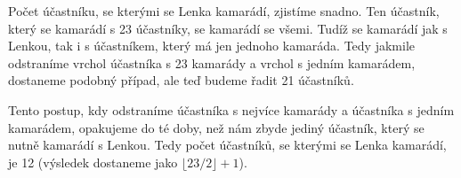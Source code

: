 \documentclass{fkssolpub}
\author{Ondřej Sedláček}
\begin{document}
Počet účastníku, se kterými se Lenka kamarádí, zjistíme snadno. Ten účastník,
který se kamarádí s 23 účastníky, se kamarádí se všemi. Tudíž se kamarádí
jak s Lenkou, tak i s účastníkem, který má jen jednoho kamaráda. Tedy jakmile
odstraníme vrchol účastníka s 23 kamarády a vrchol s jedním kamarádem, dostaneme
podobný případ, ale teď budeme řadit 21 účastníků.

Tento postup, kdy odstraníme účastníka s nejvíce kamarády a účastníka s jedním
kamarádem, opakujeme do té doby, než nám zbyde jediný účastník, který se
nutně kamarádí s Lenkou. Tedy počet účastníků, se kterými se Lenka kamarádí,
je 12 (výsledek dostaneme jako $\lfloor 23/2 \rfloor + 1$).
\end{document}
